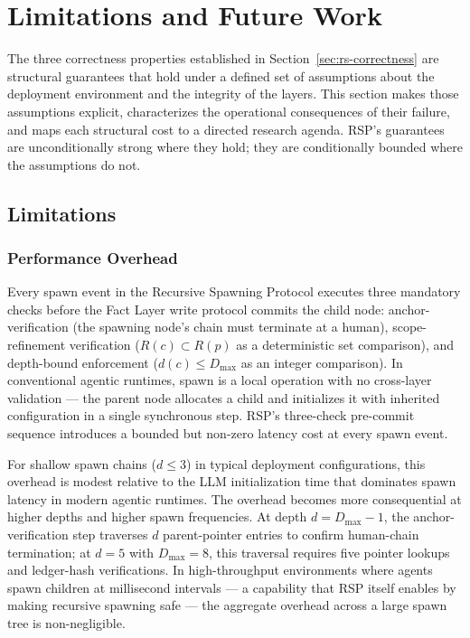 \section{Limitations and Future Work}\label{sec:rs-limitations}

The three correctness properties established in Section~\ref{sec:rs-correctness} are structural guarantees that hold under a defined set of assumptions about the deployment environment and the integrity of the \bxthree{} layers. This section makes those assumptions explicit, characterizes the operational consequences of their failure, and maps each structural cost to a directed research agenda. RSP's guarantees are unconditionally strong where they hold; they are conditionally bounded where the assumptions do not.

\subsection{Limitations}\label{sec:rs-limitations:subsection}

\subsubsection{Performance Overhead}\label{sec:rs-limitations:performance}

Every spawn event in the Recursive Spawning Protocol executes three mandatory checks before the Fact Layer write protocol commits the child node: anchor-verification (the spawning node's chain must terminate at a human), scope-refinement verification ($R(c) \subset R(p)$ as a deterministic set comparison), and depth-bound enforcement ($d(c) \leq D_{\max}$ as an integer comparison). In conventional agentic runtimes, spawn is a local operation with no cross-layer validation — the parent node allocates a child and initializes it with inherited configuration in a single synchronous step. RSP's three-check pre-commit sequence introduces a bounded but non-zero latency cost at every spawn event.

For shallow spawn chains ($d \leq 3$) in typical deployment configurations, this overhead is modest relative to the LLM initialization time that dominates spawn latency in modern agentic runtimes. The overhead becomes more consequential at higher depths and higher spawn frequencies. At depth $d = D_{\max} - 1$, the anchor-verification step traverses $d$ parent-pointer entries to confirm human-chain termination; at $d = 5$ with $D_{\max} = 8$, this traversal requires five pointer lookups and ledger-hash verifications. In high-throughput environments where agents spawn children at millisecond intervals — a capability that RSP itself enables by making recursive spawning safe — the aggregate overhead across a large spawn tree is non-negligible.

